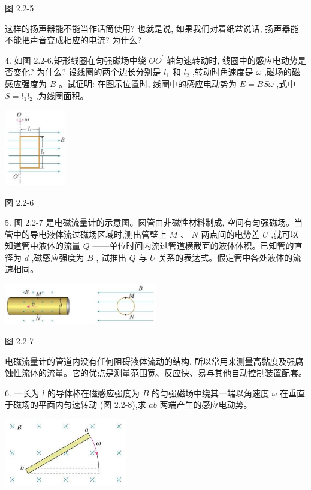 \documentclass[10pt]{article}
\begin{document}
图 2.2-5

这样的扬声器能不能当作话筒使用? 也就是说, 如果我们对着纸盆说话, 扬声器能不能把声音变成相应的电流? 为什么?

4. 如图 2.2-6,矩形线圈在匀强磁场中绕 \(O{O}^{\prime }\) 轴匀速转动时, 线圈中的感应电动势是否变化? 为什么? 设线圈的两个边长分别是 \({l}_{1}\) 和 \({l}_{2}\) ,转动时角速度是 \(\omega\) ,磁场的磁感应强度为 \(B\) 。试证明: 在图示位置时, 线圈中的感应电动势为 \(E = {BS\omega }\) ,式中 \(S = {l}_{1}{l}_{2}\) ,为线圈面积。

\begin{center}
\includegraphics[max width=0.2\textwidth]{images/01910e72-c5b7-7ed5-a6d4-fb3a5faefc32_39_661803.jpg}
\end{center}

图 2.2-6

5. 图 2.2-7 是电磁流量计的示意图。圆管由非磁性材料制成, 空间有匀强磁场。当管中的导电液体流过磁场区域时,测出管壁上 \(M\) 、 \(N\) 两点间的电势差 \(U\) ,就可以知道管中液体的流量 \(Q\) ——单位时间内流过管道横截面的液体体积。已知管的直径为 \(d\) ,磁感应强度为 \(B\) , 试推出 \(Q\) 与 \(U\) 关系的表达式。假定管中各处液体的流速相同。

\begin{center}
\includegraphics[max width=0.5\textwidth]{images/01910e72-c5b7-7ed5-a6d4-fb3a5faefc32_39_506958.jpg}
\end{center}

图 2.2-7

电磁流量计的管道内没有任何阻碍液体流动的结构, 所以常用来测量高黏度及强腐蚀性流体的流量。它的优点是测量范围宽、反应快、易与其他自动控制装置配套。

6. 一长为 \(l\) 的导体棒在磁感应强度为 \(B\) 的匀强磁场中绕其一端以角速度 \(\omega\) 在垂直于磁场的平面内匀速转动 (图 2.2-8),求 \({ab}\) 两端产生的感应电动势。

\begin{center}
\includegraphics[max width=0.4\textwidth]{images/01910e72-c5b7-7ed5-a6d4-fb3a5faefc32_39_917581.jpg}
\end{center}
\end{document}
